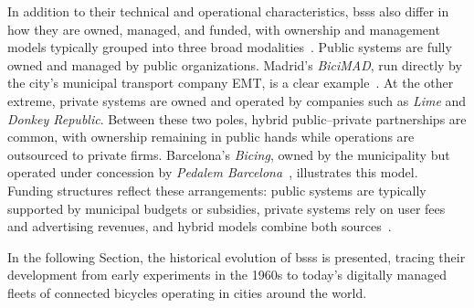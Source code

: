 In addition to their technical and operational characteristics, \acp{bss} also differ in how they are owned, managed, and funded, with ownership and management models typically grouped into three broad modalities~\cite{Li2021, Cao2022}. Public systems are fully owned and managed by public organizations. Madrid’s \textit{BiciMAD}, run directly by the city’s municipal transport company EMT, is a clear example~\cite{BiciMAD2025}. At the other extreme, private systems are owned and operated by companies such as \textit{Lime} and \textit{Donkey Republic}. Between these two poles, hybrid public–private partnerships are common, with ownership remaining in public hands while operations are outsourced to private firms. Barcelona’s \textit{Bicing}, owned by the municipality but operated under concession by \textit{Pedalem Barcelona}~\cite{BicingPedalem2017}, illustrates this model. Funding structures reflect these arrangements: public systems are typically supported by municipal budgets or subsidies, private systems rely on user fees and advertising revenues, and hybrid models combine both sources~\cite{Shaheen2010}.

In the following Section, the historical evolution of \acp{bss} is presented, tracing their development from early experiments in the 1960s to today’s digitally managed fleets of connected bicycles operating in cities around the world.